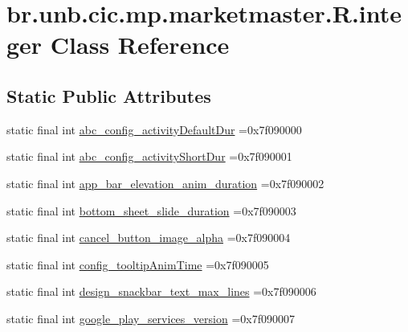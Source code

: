 \hypertarget{classbr_1_1unb_1_1cic_1_1mp_1_1marketmaster_1_1R_1_1integer}{}\section{br.\+unb.\+cic.\+mp.\+marketmaster.\+R.\+integer Class Reference}
\label{classbr_1_1unb_1_1cic_1_1mp_1_1marketmaster_1_1R_1_1integer}
\subsection*{Static Public Attributes}
\begin{DoxyCompactItemize}
\item 
static final int \mbox{\hyperlink{classbr_1_1unb_1_1cic_1_1mp_1_1marketmaster_1_1R_1_1integer_a7b47f61aff255d13d8755080390ad5b6}{abc\+\_\+config\+\_\+activity\+Default\+Dur}} =0x7f090000
\item 
static final int \mbox{\hyperlink{classbr_1_1unb_1_1cic_1_1mp_1_1marketmaster_1_1R_1_1integer_aaf2dec86acdea83f2138485fe830bb1c}{abc\+\_\+config\+\_\+activity\+Short\+Dur}} =0x7f090001
\item 
static final int \mbox{\hyperlink{classbr_1_1unb_1_1cic_1_1mp_1_1marketmaster_1_1R_1_1integer_a97b514d47193680c7e2a7aba4db7b586}{app\+\_\+bar\+\_\+elevation\+\_\+anim\+\_\+duration}} =0x7f090002
\item 
static final int \mbox{\hyperlink{classbr_1_1unb_1_1cic_1_1mp_1_1marketmaster_1_1R_1_1integer_a0357bc49c81dd0edfa0e80a2391210f9}{bottom\+\_\+sheet\+\_\+slide\+\_\+duration}} =0x7f090003
\item 
static final int \mbox{\hyperlink{classbr_1_1unb_1_1cic_1_1mp_1_1marketmaster_1_1R_1_1integer_a1d45509212b4fe54506e4452f11e5e5e}{cancel\+\_\+button\+\_\+image\+\_\+alpha}} =0x7f090004
\item 
static final int \mbox{\hyperlink{classbr_1_1unb_1_1cic_1_1mp_1_1marketmaster_1_1R_1_1integer_a7711ee2ff0b9febe0e6cbb32e7d84b80}{config\+\_\+tooltip\+Anim\+Time}} =0x7f090005
\item 
static final int \mbox{\hyperlink{classbr_1_1unb_1_1cic_1_1mp_1_1marketmaster_1_1R_1_1integer_a6e449fc08dd8bfa986683a5029968eb2}{design\+\_\+snackbar\+\_\+text\+\_\+max\+\_\+lines}} =0x7f090006
\item 
static final int \mbox{\hyperlink{classbr_1_1unb_1_1cic_1_1mp_1_1marketmaster_1_1R_1_1integer_ae107822c2d0153e4d0d37730cb160fe4}{google\+\_\+play\+\_\+services\+\_\+version}} =0x7f090007

\end{DoxyCompactItemize}
